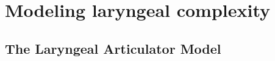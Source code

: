 \chapter{Modeling laryngeal complexity} \label{ch:modeling_lc}

\section{The Laryngeal Articulator Model}\label{sec:lam}

\citet{eslingThereAreNo2005,eslingVoiceQualityLaryngeal2019,moisikPhonologicalPotentialsLower2021,moisikMultimodalImagingGlottal2015,moisikModelingBiomechanicalInfluence2014}

